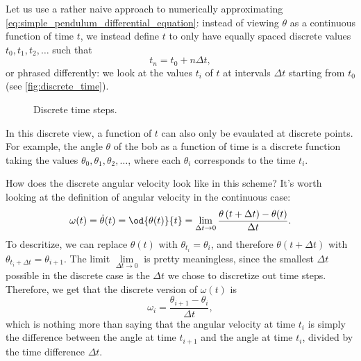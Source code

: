 Let us use a rather naive approach to numerically approximating \autoref{eq:simple_pendulum_differential_equation}: instead of viewing $\theta$ as a continuous function of time $t$, we instead define $t$ to only have equally spaced discrete values $t_{0},t_{1},t_{2},\dots$ such that
\begin{equation}
	t_{n} = t_{0} + n\Delta t,
\end{equation}
or phrased differently: we look at the values $t_{i}$ of $t$ at intervals $\Delta t$ starting from $t_{0}$ (see \autoref{fig:discrete_time}).

\begin{figure}
	\begin{center}
	\end{center}
	\caption{Discrete time steps.}
	\label{fig:discrete_time}
\end{figure}

In this discrete view, a function of $t$ can also only be evaulated at discrete points. For example, the angle $\theta$ of the bob as a function of time is a discrete function taking the values $\theta_{0},\theta_{1},\theta_{2},\dots$, where each $\theta_{i}$ corresponds to the time $t_{i}$.

How does the discrete angular velocity look like in this scheme? It's worth looking at the definition of angular velocity in the continuous case:
\begin{equation}
	\omega(t) = \dot{\theta}(t) = \od{\theta(t)}{t} = \lim\limits_{\Delta t\to0}\frac{\theta\left(t+\Delta t\right)-\theta(t)}{\Delta t}.
	\label{eq:label}
\end{equation}
To descritize, we can replace $\theta(t)$ with $\theta_{t_{i}}=\theta_{i}$, and therefore $\theta\left(t+\Delta t\right)$ with $\theta_{t_{i}+\Delta t}=\theta_{i+1}$. The limit $\lim\limits_{\Delta t\to 0}$ is pretty meaningless, since the smallest $\Delta t$ possible in the discrete case is the $\Delta t$ we chose to discretize out time steps. Therefore, we get that the discrete version of $\omega(t)$ is
\begin{equation}
	\omega_{i} = \frac{\theta_{i+1}-\theta_{i}}{\Delta t},
	\label{eq:discrete_velocity}
\end{equation}
which is nothing more than saying that the angular velocity at time $t_{i}$ is simply the difference between the angle at time $t_{i+1}$ and the angle at time $t_{i}$, divided by the time difference $\Delta t$.

